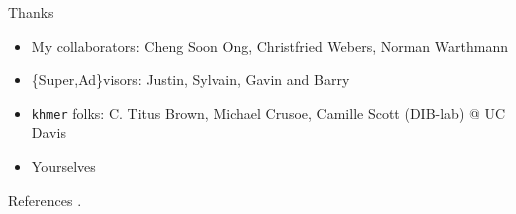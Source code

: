 \documentclass[t]{beamer}
\begin{document}
\begin{frame}{Thanks}
  \begin{itemize}
    \item My collaborators: Cheng Soon Ong, Christfried Webers, Norman Warthmann
    \item \{Super,Ad\}visors: Justin, Sylvain, Gavin and Barry
    \item \texttt{khmer} folks: C. Titus Brown, Michael Crusoe, Camille Scott
          (DIB-lab) @ UC Davis
    \item Yourselves
  \end{itemize}
\end{frame}

\begin{frame}[shrink=20]{References}
  \printbibliography
  \vfill
  .
\end{frame}
\end{document}
